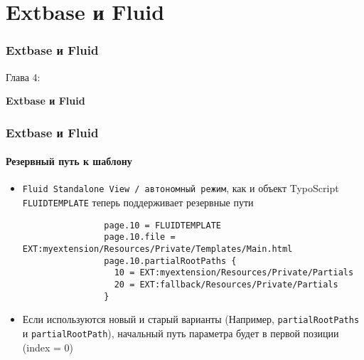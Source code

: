 %

\section{Extbase и Fluid}
\begin{frame}[fragile]
	\frametitle{Extbase и Fluid}

	\begin{center}\huge{Глава 4:}\end{center}
	\begin{center}\huge{\color{typo3darkgrey}\textbf{Extbase и Fluid}}\end{center}

\end{frame}


\begin{frame}[fragile]
	\frametitle{Extbase и Fluid}
	\framesubtitle{Резервный путь к шаблону}

	\lstset{
		basicstyle=\tiny\ttfamily
	}

	\begin{itemize}
		\item \texttt{Fluid Standalone View / автономный режим}, как и объект TypoScript \texttt{FLUIDTEMPLATE} теперь поддерживает резервные пути

			\begin{lstlisting}
				page.10 = FLUIDTEMPLATE
				page.10.file = EXT:myextension/Resources/Private/Templates/Main.html
				page.10.partialRootPaths {
				  10 = EXT:myextension/Resources/Private/Partials
				  20 = EXT:fallback/Resources/Private/Partials
				}
			\end{lstlisting}

		\item Если используются новый и старый варианты (Например, \texttt{partialRootPaths} и \texttt{partialRootPath}),
			начальный путь параметра будет в первой позиции (index = 0)

	\end{itemize}

\end{frame}

